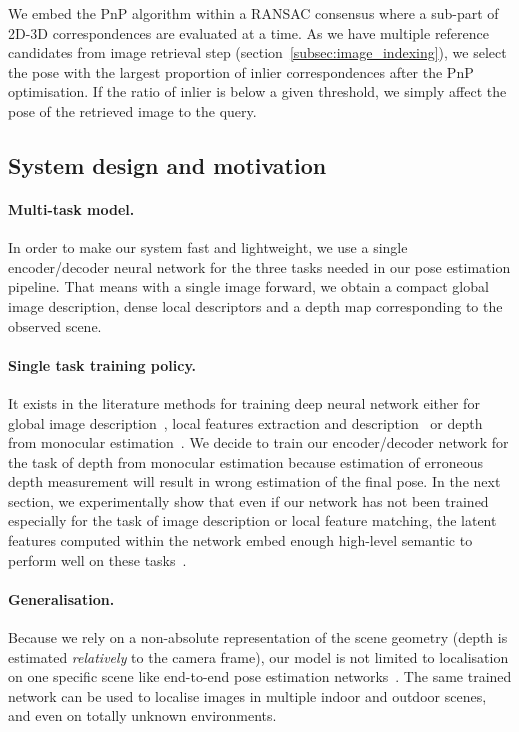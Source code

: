 We embed the PnP algorithm within a RANSAC consensus where a sub-part of 2D-3D correspondences are evaluated at a time. As we have multiple reference candidates from image retrieval step (section~\ref{subsec:image_indexing}), we select the pose with the largest proportion of inlier correspondences after the PnP optimisation. If the ratio of inlier is below a given threshold, we simply affect the pose of the retrieved image to the query.

\subsection{System design and motivation}
\paragraph{Multi-task model.} In order to make our system fast and lightweight, we use a single encoder/decoder neural network for the three tasks needed in our pose estimation pipeline. That means with a single image forward, we obtain a compact global image description, dense local descriptors and a depth map corresponding to the observed scene.
\paragraph{Single task training policy.} It exists in the literature methods for training deep neural network either for global image description~\citep{Arandjelovic2017, Radenovic2017, Gordo2017}, local features extraction and description~\citep{Yi2016a, Rocco2018, Ono2018} or depth from monocular estimation~\citep{Eigen2014, Godard2017, Mahjourian2018}. We decide to train our encoder/decoder network for the task of depth from monocular estimation because estimation of erroneous depth measurement will result in wrong estimation of the final pose. In the next section, we experimentally show that even if our network has not been trained especially for the task of image description or local feature matching, the latent features computed within the network embed enough high-level semantic to perform well on these tasks~\citep{Taira2018, Zamir2018b}.
\paragraph{Generalisation.} Because we rely on a non-absolute representation of the scene geometry (depth is estimated \textit{relatively} to the camera frame), our model is not limited to localisation on one specific scene like end-to-end pose estimation networks~\citep{Kendall2017, Brachmann2018}. The same trained network can be used to localise images in multiple indoor and outdoor scenes, and even on totally unknown environments. 